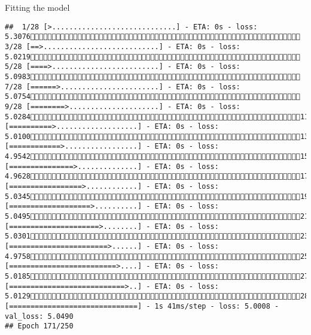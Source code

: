 \documentclass[
  ignorenonframetext,
]{beamer}
\begin{document}
\begin{frame}[fragile]{Fitting the model}
\begin{verbatim}
##  1/28 [>.............................] - ETA: 0s - loss: 5.3076 3/28 [==>...........................] - ETA: 0s - loss: 5.0219 5/28 [====>.........................] - ETA: 0s - loss: 5.0983 7/28 [======>.......................] - ETA: 0s - loss: 5.0754 9/28 [========>.....................] - ETA: 0s - loss: 5.028411/28 [==========>...................] - ETA: 0s - loss: 5.010013/28 [============>.................] - ETA: 0s - loss: 4.954215/28 [===============>..............] - ETA: 0s - loss: 4.962817/28 [=================>............] - ETA: 0s - loss: 5.034519/28 [===================>..........] - ETA: 0s - loss: 5.049521/28 [=====================>........] - ETA: 0s - loss: 5.030123/28 [=======================>......] - ETA: 0s - loss: 4.975825/28 [=========================>....] - ETA: 0s - loss: 5.018527/28 [===========================>..] - ETA: 0s - loss: 5.012928/28 [==============================] - 1s 41ms/step - loss: 5.0008 - val_loss: 5.0490
## Epoch 171/250

\end{verbatim}
\end{frame}
\end{document}
